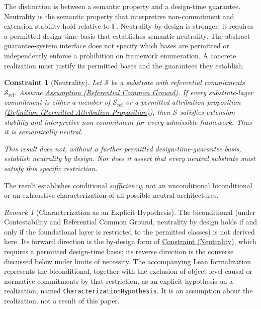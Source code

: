 \documentclass[11pt]{article}
\theoremstyle{plain}
\newtheorem{constraint}[theorem]{Constraint}
\theoremstyle{definition}
\theoremstyle{remark}
\newtheorem{remark}[theorem]{Remark}
\newcommand{\DefRef}[2]{\hyperref[#1]{Definition (#2)}}
\newcommand{\AssumpRef}[2]{\hyperref[#1]{Assumption (#2)}}
\newcommand{\ConstRef}[2]{\hyperref[#1]{Constraint (#2)}}
\newcommand{\Substrate}{\mathcal{S}}
\newcommand{\SubstrateRef}{\mathcal{S}_{\mathrm{ref}}}
\newcommand{\Frameworks}{\mathbb{F}}
\begin{document}
The distinction is between a semantic property and a design-time guarantee.
Neutrality is the semantic property that interpretive non-commitment and
extension stability hold relative to $\Frameworks$.
Neutrality by design is stronger:
it requires a permitted design-time basis that establishes semantic neutrality.
The abstract guarantee-system interface does not specify which bases
are permitted or independently enforce a prohibition on framework enumeration.
A concrete realization must justify its permitted bases and
the guarantees they establish.

\begin{constraint}[Neutrality]
  \label{se100.constraint.Neutrality}
  Let $\Substrate$ be a substrate with referential commitments
  $\SubstrateRef$. Assume
  \AssumpRef{se100.assump.ReferentialCommonGround}{Referential Common Ground}.
  If every substrate-layer commitment is either a member of
  $\SubstrateRef$ or a permitted attribution proposition
  (\DefRef{se100.def.PermittedAttributionProposition}
  {Permitted Attribution Proposition}),
  then $\Substrate$ satisfies extension stability and
  interpretive non-commitment for every admissible framework.
  Thus it is semantically neutral.

  This result does not, without a further permitted
  design-time-guarantee basis, establish neutrality by design.
  Nor does it assert that every neutral substrate must satisfy
  this specific restriction.
\end{constraint}

The result establishes conditional \emph{sufficiency}, not an
unconditional biconditional or an exhaustive characterization of all
possible neutral architectures.

\begin{remark}[Characterization as an Explicit Hypothesis]
  \label{se100.remark.CharacterizationHypothesis}
  The biconditional (under Contestability and Referential Common
  Ground, neutrality by design holds if and only if the foundational
  layer is restricted to the permitted classes) is not derived here.
  Its forward direction is the by-design form of
  \ConstRef{se100.constraint.Neutrality}{Neutrality}, which requires a
  permitted design-time basis; its reverse direction is the converse
  discussed below under limits of necessity.
  The accompanying Lean formalization represents the biconditional,
  together with the exclusion of object-level causal or normative
  commitments by that restriction, as an explicit hypothesis on a
  realization, named \texttt{CharacterizationHypothesis}.
  It is an assumption about the realization, not a result of this paper.
\end{remark}
\end{document}
